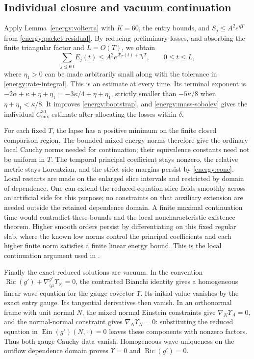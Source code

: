 \subsection{Individual closure and vacuum continuation}

Apply Lemma~\ref{energy:volterra} with \(K=60\), the entry bounds,
and \(S_j\le A^2e^{\eta T}\) from
\eqref{energy:packet-residual}. By reducing preliminary losses, and
absorbing the finite triangular factor and \(L=O(T)\), we obtain
\begin{equation}\label{energy:individual-time}
 \sum_{j\le60}E_j(t)
       \le A^2 e^{\mathcal R_T(t)+\eta_1T},
               \qquad 0\le t\le L,
\end{equation}
where \(\eta_1>0\) can be made arbitrarily small along with the
tolerance in \eqref{energy:rate-integral}. This is an estimate at
every time. Its terminal exponent is
\(-2\alpha+\kappa+\eta+\eta_1
=-3\kappa/4+\eta+\eta_1\), strictly smaller than
\(-5\kappa/8\) when \(\eta+\eta_1<\kappa/8\). It improves
\eqref{energy:bootstrap}, and \eqref{energy:mass-sobolev} gives the
individual \(C^{30}_{\mathrm{mix}}\) estimate after allocating the
losses within \(\delta\).

For each fixed \(T\), the lapse has a positive minimum on the
finite closed comparison region. The bounded mixed energy norms
therefore give the ordinary local Cauchy norms needed for continuation;
their equivalence constants need not be uniform in \(T\). The
temporal principal coefficient stays nonzero, the relative metric
stays Lorentzian, and the strict side margins persist by
\eqref{energy:cone}. Local restarts are made on the enlarged slice
intervals and restricted by domain of dependence. One can extend
the reduced-equation slice fields smoothly across an artificial side
for this purpose; no constraints on that auxiliary extension are
needed outside the retained dependence domain. A finite maximal
continuation time would contradict these bounds and the local
noncharacteristic existence theorem. Higher smooth orders persist
by differentiating on this fixed regular slab, where the known low
norms control the principal coefficients and each higher finite norm
satisfies a finite linear energy bound. This is the local continuation
argument used in \cite[ and ]{Foundation}.

Finally the exact reduced solutions are vacuum. In the convention
\(\operatorname{Ric}(g')+\nabla^{g'}_{(\mu}\Upsilon_{\nu)}=0\),
the contracted Bianchi identity gives a homogeneous linear wave
equation for the gauge covector \(\Upsilon\). Its initial value
vanishes by the exact entry gauge. Its tangential derivatives then
vanish. In an orthonormal frame with unit normal \(N\), the mixed
normal Einstein constraints give
\(\nabla_N\Upsilon_A=0\), and the normal-normal constraint gives
\(\nabla_N\Upsilon_N=0\): substituting the reduced equation in
\(\operatorname{Ein}(g')(N,\cdot)=0\) leaves these components
with nonzero factors. Thus both gauge Cauchy data vanish. Homogeneous
wave uniqueness on the outflow dependence domain proves
\(\Upsilon=0\) and \(\operatorname{Ric}(g')=0\).

